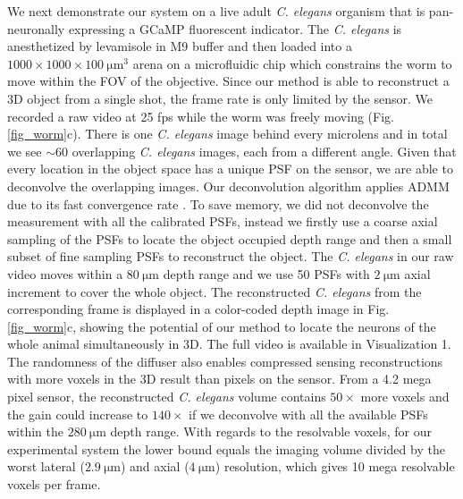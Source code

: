 \documentclass{osa-article}
\begin{document}
We next demonstrate our system on a live adult \textit{C. elegans} organism that is pan-neuronally expressing a GCaMP fluorescent indicator. The \textit{C. elegans} is anesthetized by levamisole in M9 buffer and then loaded into a $1000 \times 1000 \times \SI{100}{\micro\meter \cubed}$ arena on a microfluidic chip which constrains the worm to move within the FOV of the objective. Since our method is able to reconstruct a 3D object from a single shot, the frame rate is only limited by the sensor. We recorded a raw video at 25 fps while the worm was freely moving (Fig. \ref{fig_worm}c). There is one \textit{C. elegans} image behind every microlens and in total we see $\sim 60$ overlapping \textit{C. elegans} images, each from a different angle. Given that every location in the object space has a unique PSF on the sensor, we are able to deconvolve the overlapping images. Our deconvolution algorithm applies ADMM due to its fast convergence rate \cite{boyd2011ADMM}. To save memory, we did not deconvolve the measurement with all the calibrated PSFs, instead we firstly use a coarse axial sampling of the PSFs to locate the object occupied depth range and then a small subset of fine sampling PSFs to reconstruct the object. The \textit{C. elegans} in our raw video moves within a $\SI{80}{\micro\meter}$ depth range and we use 50 PSFs with $\SI{2}{\micro\meter} $ axial increment to cover the whole object. The reconstructed \textit{C. elegans} from the corresponding frame is displayed in a color-coded depth image in Fig. \ref{fig_worm}c, showing the potential of our method to locate the neurons of the whole animal simultaneously in 3D. The full video is available in Visualization 1. The randomness of the diffuser also enables compressed sensing reconstructions with more voxels in the 3D result than pixels on the sensor. From a 4.2 mega pixel sensor, the reconstructed \textit{C. elegans} volume contains $50 \times$ more voxels and the gain could increase to $140 \times$ if we deconvolve with all the available PSFs within the $\SI{280}{\micro\meter}$ depth range. With regards to the resolvable voxels, for our experimental system the lower bound equals the imaging volume divided by the worst lateral ($\SI{2.9}{\micro\meter}$) and axial ($\SI{4}{\micro\meter}$) resolution, which gives 10 mega resolvable voxels per frame.
\end{document}
